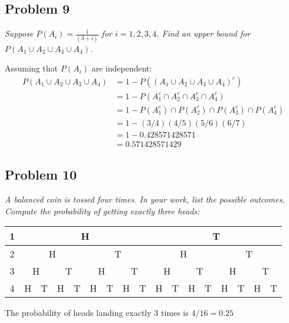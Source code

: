 \documentclass[a4paper,man,natbib]{apa6}
\begin{document}
\subsection{Problem 9}
\emph{Suppose $P(A_i )= \frac{1}{(3+i)}$ for $i=1,2,3,4$. 
	Find an upper bound for $P(A_1 \cup A_2 \cup A_3 \cup A_4)$. }\vspace{1em}

Assuming that $P(A_i )$ are independent:
\begin{align*}
	P(A_1 \cup A_2 \cup A_3 \cup A_4)
	&= 1-P((A_1 \cup A_2 \cup A_3 \cup A_4)^c) \\
	&= 1-P(A_1^c \cap A_2^c \cap A_3^c \cap A_4^c) \\
	&= 1-P(A_1^c)\cap P(A_2^c)\cap P(A_3^c) \cap P(A_4^c) \\
	&= 1-(3/4)(4/5)(5/6)(6/7) \\
	&= 1- 0.428571428571 \\
	&= 0.571428571429
\end{align*}

\subsection{Problem 10}
\emph{A balanced coin is tossed four times. In your work, list the possible outcomes. Compute the probability of getting exactly three heads:} \vspace{1em}

\begin{tabular}{|c|cccccccc|cccccccc|}
	\hline
	1 &
	\multicolumn{8}{c|}{H} &
	\multicolumn{8}{c|}{T} \\ \hline
	2 &
	\multicolumn{4}{c|}{H} &
	\multicolumn{4}{c|}{T} &
	\multicolumn{4}{c|}{H} &
	\multicolumn{4}{c|}{T} \\ \hline
	3 &
	\multicolumn{2}{c|}{H} &
	\multicolumn{2}{c|}{T} &
	\multicolumn{2}{c|}{H} &
	\multicolumn{2}{c|}{T} &
	\multicolumn{2}{c|}{H} &
	\multicolumn{2}{c|}{T} &
	\multicolumn{2}{c|}{H} &
	\multicolumn{2}{c|}{T} \\ \hline
	4 &
	\multicolumn{1}{c|}{H} &
	\multicolumn{1}{c|}{\cellcolor[HTML]{34FF34}T} &
	\multicolumn{1}{c|}{\cellcolor[HTML]{34FF34}H} &
	\multicolumn{1}{c|}{T} &
	\multicolumn{1}{c|}{\cellcolor[HTML]{34FF34}H} &
	\multicolumn{1}{c|}{T} &
	\multicolumn{1}{c|}{H} &
	T &
	\multicolumn{1}{c|}{\cellcolor[HTML]{34FF34}H} &
	\multicolumn{1}{c|}{T} &
	\multicolumn{1}{c|}{H} &
	\multicolumn{1}{c|}{T} &
	\multicolumn{1}{c|}{H} &
	\multicolumn{1}{c|}{T} &
	\multicolumn{1}{c|}{H} &
	T \\ \hline
\end{tabular}

\vspace{1em}
The probability of heads landing exactly 3 times is $4/16 = 0.25$


\end{document}

